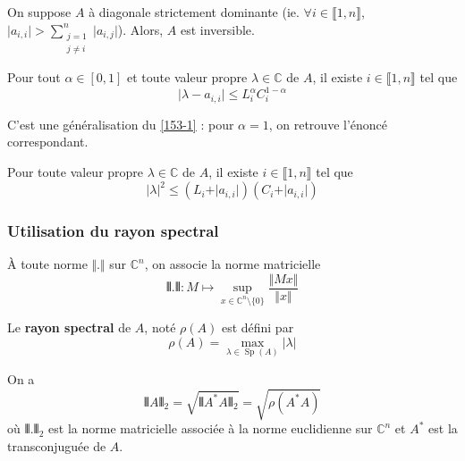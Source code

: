   \begin{corollary}
    On suppose $A$ à diagonale strictement dominante (ie. $\forall i \in \llbracket 1, n \rrbracket$, $\vert a_{i,i} \vert > \sum_{\substack{j=1 \\ j \neq i}}^n \vert a_{i,j} \vert$). Alors, $A$ est inversible.
  \end{corollary}

  \begin{theorem}
    Pour tout $\alpha \in [0,1]$ et toute valeur propre $\lambda \in \mathbb{C}$ de $A$, il existe $i \in \llbracket 1, n \rrbracket$ tel que
    \[ \vert \lambda - a_{i,i} \vert \leq L_i^{\alpha} C_i^{1-\alpha} \]
  \end{theorem}

  \begin{remark}
    C'est une généralisation du \cref{153-1} : pour $\alpha = 1$, on retrouve l'énoncé correspondant.
  \end{remark}

  \begin{corollary}
    Pour toute valeur propre $\lambda \in \mathbb{C}$ de $A$, il existe $i \in \llbracket 1, n \rrbracket$ tel que
    \[ \vert \lambda \vert^2 \leq (L_i + \vert a_{i,i} \vert) (C_i + \vert a_{i,i} \vert) \]
  \end{corollary}

  \subsubsection{Utilisation du rayon spectral}

  \begin{notation}
    À toute norme $\Vert . \Vert$ sur $\mathbb{C}^n$, on associe la norme matricielle
    \[ \VERT . \VERT : M \mapsto \sup_{x \in \mathbb{C}^n \setminus \{ 0 \}} \frac{\Vert Mx \Vert}{\Vert x \Vert} \]
  \end{notation}

  \begin{definition}
    Le \textbf{rayon spectral} de $A$, noté $\rho(A)$ est défini par
    \[ \rho(A) = \max_{\lambda \in \operatorname{Sp}(A)} \vert \lambda \vert \]
  \end{definition}

  \begin{theorem}
    On a
    \[ \VERT A \VERT_2 = \sqrt{\VERT A^* A \VERT_2} = \sqrt{\rho(A^* A)} \]
    où $\VERT . \VERT_2$ est la norme matricielle associée à la norme euclidienne sur $\mathbb{C}^n$ et $A^*$ est la transconjuguée de $A$.
  \end{theorem}

